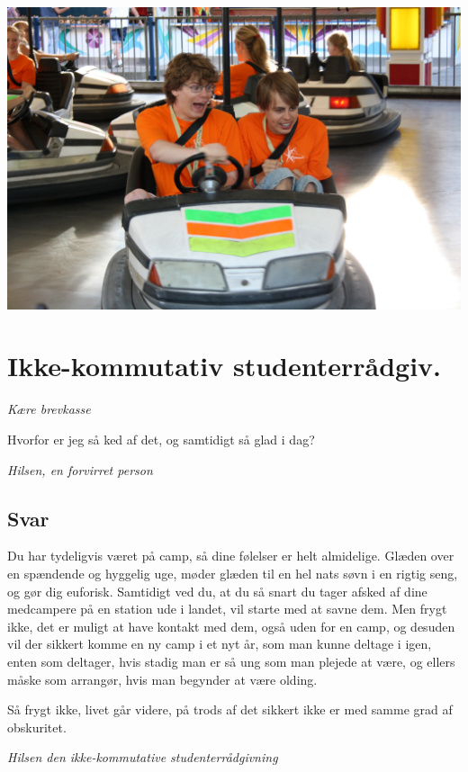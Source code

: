 \begin{minipage}[t]{120mm}
\vspace{3mm}

\includegraphics[width=\linewidth]{radiobil3.jpg}

\section*{Ikke-kommutativ studenterrådgiv.}
\emph{Kære brevkasse}

Hvorfor er jeg så ked af det, og samtidigt så glad i dag?

\emph{Hilsen, en forvirret person}

\subsection*{Svar}

Du har tydeligvis været på camp, så dine følelser er helt almidelige. Glæden over en spændende og hyggelig uge, møder glæden til en hel nats søvn i en rigtig seng, og gør dig euforisk. Samtidigt ved du, at du så snart du tager afsked af dine medcampere på en station ude i landet, vil starte med at savne dem. Men frygt ikke, det er muligt at have kontakt med dem, også uden for en camp, og desuden vil der sikkert komme en ny camp i et nyt år, som man kunne deltage i igen, enten som deltager, hvis stadig man er så ung som man plejede at være, og ellers måske som arrangør, hvis man begynder at være olding.

Så frygt ikke, livet går videre, på trods af det sikkert ikke er med samme grad af obskuritet.

{\flushright\emph{Hilsen den ikke-kommutative studenterrådgivning}}


\end{minipage}
